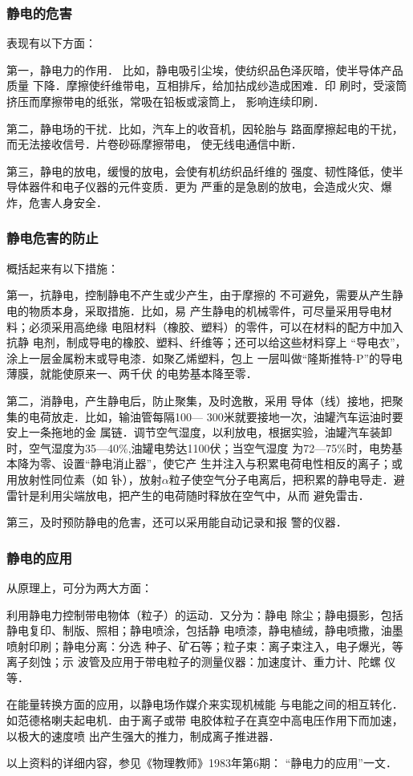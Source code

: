 \subsubsection{静电的危害}

表现有以下方面：

第一，静电力的作用．
比如，静电吸引尘埃，使纺织品色泽灰暗，使半导体产品质量
下降．摩擦使纤维带电，互相排斥，给加拈成纱造成困难．印
刷时，受滚筒挤压而摩擦带电的纸张，常吸在铅板或滚筒上，
影响连续印刷．

第二，静电场的干扰．比如，汽车上的收音机，因轮胎与
路面摩擦起电的干扰，而无法接收信号．片卷砂砾摩擦带电，
使无线电通信中断．

第三，静电的放电，缓慢的放电，会使有机纺织品纤维的
强度、韧性降低，使半导体器件和电子仪器的元件变质．更为
严重的是急剧的放电，会造成火灾、爆炸，危害人身安全．


\subsubsection{静电危害的防止}

概括起来有以下措施：

第一，抗静电，控制静电不产生或少产生，由于摩擦的
不可避免，需要从产生静电的物质本身，采取措施．比如，易
产生静电的机械零件，可尽量采用导电材料；必须采用高绝缘
电阻材料（橡胶、塑料）的零件，可以在材料的配方中加入抗静
电剂，制成导电的橡胶、塑料、纤维等；还可以给这些材料穿上
“导电衣”，涂上一层金属粉末或导电漆．如聚乙烯塑料，包上
一层叫做“隆斯推特-P”的导电薄膜，就能使原来一、两千伏
的电势基本降至零．

第二，消静电，产生静电后，防止聚集，及时逸散，采用
导体（线）接地，把聚集的电荷放走．比如，输油管每隔100—
300米就要接地一次，油罐汽车运油时要安上一条拖地的金
属链．调节空气湿度，以利放电，根据实验，油罐汽车装卸
时，空气湿度为35—40\%,油罐电势达1100伏；当空气湿度
为72—75\%时，电势基本降为零、设置“静电消止器”，使它产
生并注入与积累电荷电性相反的离子；或用放射性同位素（如
钋），放射$\alpha$粒子使空气分子电离后，把积累的静电导走．避
雷针是利用尖端放电，把产生的电荷随时释放在空气中，从而
避免雷击．

第三，及时预防静电的危害，还可以采用能自动记录和报
警的仪器．

\subsubsection{静电的应用}

从原理上，可分为两大方面：

利用静电力控制带电物体（粒子）的运动．又分为：静电
除尘；静电摄影，包括静电复印、制版、照相；静电喷涂，包括静
电喷漆，静电植绒，静电喷撒，油墨喷射印刷；静电分离：分选
种子、矿石等；粒子束：离子束注入，电子爆光，等离子刻蚀；示
波管及应用于带电粒子的测量仪器：加速度计、重力计、陀螺
仪等．

在能量转换方面的应用，以静电场作媒介来实现机械能
与电能之间的相互转化．如范德格喇夫起电机．由于离子或带
电胶体粒子在真空中高电压作用下而加速，以极大的速度喷
出产生强大的推力，制成离子推进器．

以上资料的详细内容，参见《物理教师》1983年第6期：
“静电力的应用”一文．




